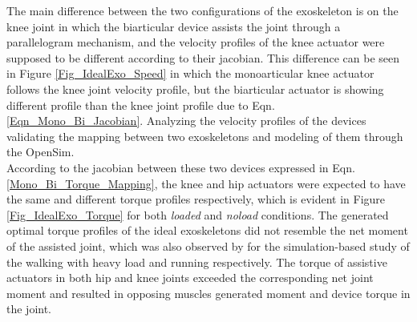 \documentclass[10pt,letterpaper]{article}
\begin{document}
The main difference between the two configurations of the exoskeleton is on the knee joint in which the biarticular device assists the joint through a parallelogram mechanism, and the velocity profiles of the knee actuator were supposed to be different according to their jacobian. This difference can be seen in Figure \ref{Fig_IdealExo_Speed} in which the monoarticular knee actuator follows the knee joint velocity profile, but the biarticular actuator is showing different profile than the knee joint profile due to Eqn. \eqref{Eqn_Mono_Bi_Jacobian}. Analyzing the velocity profiles of the devices validating the mapping between two exoskeletons and modeling of them through the OpenSim.\\
According to the jacobian between these two devices expressed in Eqn. \ref{Mono_Bi_Torque_Mapping}, the knee and hip actuators were expected to have the same and different torque profiles respectively, which is evident in Figure \ref{Fig_IdealExo_Torque} for both \textit{loaded} and \textit{noload} conditions. The generated optimal torque profiles of the ideal exoskeletons did not resemble the net moment of the assisted joint, which was also observed by \cite{93,2} for the simulation-based study of the walking with heavy load and running respectively. The torque of assistive actuators in both hip and knee joints exceeded the corresponding net joint moment and resulted in opposing muscles generated moment and device torque in the joint.\\
\end{document}
